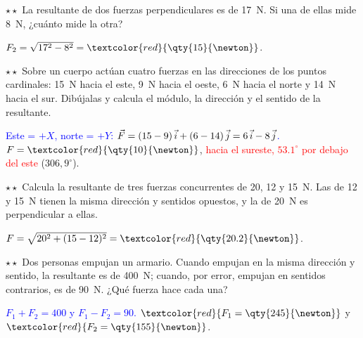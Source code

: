 \begin{exercise}
    \(\star\star\) La resultante de dos fuerzas perpendiculares es de \qty{17}{\newton}. Si una de ellas mide \qty{8}{\newton},
    ¿cuánto mide la otra?
    \begin{solu}
        \(F_2 = \sqrt{17^2 - 8^2} = \textcolor{red}{\qty{15}{\newton}}\).
    \end{solu}
\end{exercise}

\begin{exercise}
    \(\star\star\) Sobre un cuerpo actúan cuatro fuerzas en las direcciones de los puntos cardinales: \qty{15}{\newton} hacia el este,
    \qty{9}{\newton} hacia el oeste, \qty{6}{\newton} hacia el norte y \qty{14}{\newton} hacia el sur. Dibújalas y calcula el módulo,
    la dirección y el sentido de la resultante.
    \begin{solu}
        \textcolor{blue}{Este = \(+X\), norte = \(+Y\): \(\vec{F} = (15 - 9)\,\vec{i} + (6 - 14)\,\vec{j} = 6\,\vec{i} - 8\,\vec{j}\).}
        \(F = \textcolor{red}{\qty{10}{\newton}}\), \textcolor{red}{hacia el sureste, \(\num{53.1}^\circ\) por debajo del este}
        (\(306{,}9^\circ\)).
    \end{solu}
\end{exercise}

\begin{exercise}
    \(\star\star\) Calcula la resultante de tres fuerzas concurrentes de 20, 12 y \qty{15}{\newton}. Las de 12 y \qty{15}{\newton}
    tienen la misma dirección y sentidos opuestos, y la de \qty{20}{\newton} es perpendicular a ellas.
    \begin{solu}
        \(F = \sqrt{20^2 + (15 - 12)^2} = \textcolor{red}{\qty{20.2}{\newton}}\).
    \end{solu}
\end{exercise}

\begin{exercise}
    \(\star\star\) Dos personas empujan un armario. Cuando empujan en la misma dirección y sentido, la resultante es de
    \qty{400}{\newton}; cuando, por error, empujan en sentidos contrarios, es de \qty{90}{\newton}. ¿Qué fuerza hace cada una?
    \begin{solu}
        \textcolor{blue}{\(F_1 + F_2 = 400\) y \(F_1 - F_2 = 90\).} \(\textcolor{red}{F_1 = \qty{245}{\newton}}\) y
        \(\textcolor{red}{F_2 = \qty{155}{\newton}}\).
    \end{solu}
\end{exercise}

